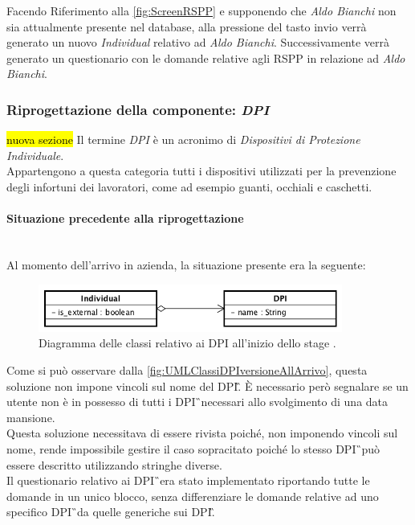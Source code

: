 	Facendo Riferimento alla \autoref{fig:ScreenRSPP} e  supponendo che \textit{Aldo Bianchi} non sia attualmente presente nel database, alla pressione del tasto invio verrà generato un nuovo \textit{Individual} relativo ad \textit{Aldo Bianchi}. Successivamente verrà generato un questionario con le domande relative agli RSPP in relazione ad \textit{Aldo Bianchi}.
	
\newpage
\subsubsection{Riprogettazione della componente: \textit{DPI}}
\hl{nuova sezione}
Il termine \textit{DPI} è un acronimo di \textit{Dispositivi di Protezione Individuale}. \\
Appartengono a questa categoria tutti i dispositivi utilizzati per la prevenzione degli infortuni dei lavoratori, come ad esempio guanti, occhiali e caschetti.\\

\paragraph*{Situazione precedente alla riprogettazione} \mbox{} \\
Al momento dell'arrivo in azienda, la situazione presente era la seguente:
	\begin{figure}[H]
		\begin{center}
			\includegraphics[width=10cm]{Pics/UMLClassiDPIversioneAllArrivo.png}
			\caption{
			Diagramma delle classi relativo ai DPI all'inizio dello stage .}
			\label{fig:UMLClassiDPIversioneAllArrivo}
		\end{center}
	\end{figure}


Come si può osservare dalla \autoref{fig:UMLClassiDPIversioneAllArrivo}, questa soluzione non impone vincoli sul nome del \gls{DPI}\G.
È necessario però segnalare se un utente non è in possesso di tutti i \gls{DPI}\G\ necessari allo svolgimento di una data mansione.\\
Questa soluzione necessitava di essere rivista poiché, non imponendo vincoli sul nome, rende impossibile gestire il caso sopracitato poiché lo stesso \gls{DPI}\G\ può essere descritto utilizzando stringhe diverse.\\
Il questionario relativo ai \gls{DPI}\G\ era stato implementato riportando tutte le domande in un unico blocco, senza differenziare le domande relative ad uno specifico \gls{DPI}\G\ da quelle generiche sui \gls{DPI}\G.

